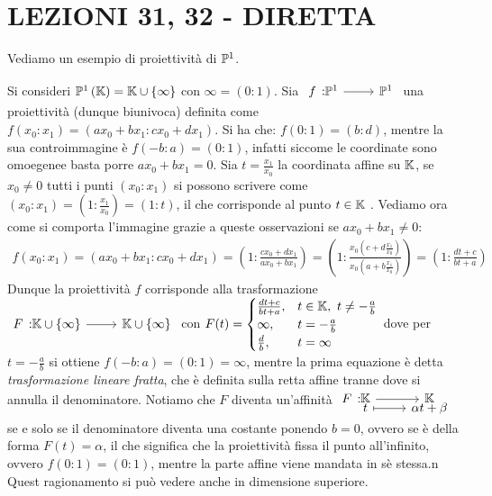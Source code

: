 \section{LEZIONI 31, 32 - DIRETTA}


Vediamo un esempio di proiettività di $\proj[1]{\ }$.
\begin{example}
	Si consideri $\proj[1]{\kamp} = \kamp \cup \{\infty\}$ con $\infty=(0\colon 1)$. Sia $\funz f {\proj[1]{\ }} {\proj[1]{\ }}$ una proiettività (dunque biunivoca) definita come $f(x_0\colon x_1)=(ax_0+bx_1\colon cx_0+dx_1)$. Si ha che: $f(0\colon 1)=(b\colon d)$, mentre la sua controimmagine è $f(-b\colon a)=(0\colon 1)$, infatti siccome le coordinate sono omoegenee basta porre $ax_0+bx_1=0$.\newline
	Sia $t=\frac{x_1}{x_0}$ la coordinata affine su $\mathbb{K}$, se $x_0\neq 0$ tutti i punti $(x_0\colon x_1)$ si possono scrivere come $(x_0\colon x_1)=\left( 1\colon \frac{x_1}{x_0} \right)=(1\colon t)$, il che corrisponde al punto $t\in\mathbb{K}$ . Vediamo ora come si comporta l'immagine grazie a queste osservazioni se $ax_0+bx_1\neq 0$:
	\begin{gather*}
		f(x_0\colon x_1)=(ax_0+bx_1\colon cx_0+dx_1)= \left( 1\colon \frac{cx_0+dx_1}{ax_0+bx_1} \right)  =  \left( 1 \colon  \frac{ x_0 \left( c+ d \frac{x_1}{x_0} \right) }{ x_0 \left( a+ b\frac{ x_1 }{ x_0 } \right)} \right)=\left( 1\colon \frac{dt+c}{bt+a}\right)
	\end{gather*}
	Dunque la proiettività $f$ corrisponde alla trasformazione $\funz F {\kamp\cup \{\infty\}} {\kamp\cup \{\infty\}}$ con $F(t)=\begin{cases}
		\frac{dt+c}{bt+a}, & t\in\mathbb{K}, \ t\neq -\frac{a}{b}\\
		\infty, & t=-\frac{a}{b}\\
		\frac{d}{b}, & t=\infty
	\end{cases}$
	dove per $t=-\frac{a}{b}$ si ottiene $f(-b\colon a)=(0\colon 1)=\infty$, mentre la prima equazione è detta \textit{trasformazione lineare fratta}, che è definita sulla retta affine tranne dove si annulla il denominatore. \newline
	Notiamo che $F$ diventa un'affinità $\funztot F \kamp \kamp t {\alpha t+\beta}$ se e solo se il denominatore diventa una costante ponendo $b=0$, ovvero se è della forma $F(t)=\alpha$, il che significa che la proiettività fissa il punto all'infinito, ovvero $f(0\colon 1)=(0\colon 1)$, mentre la parte affine viene mandata in sè stessa.n\newline 
	Quest ragionamento si può vedere anche in dimensione superiore.
\end{example}

